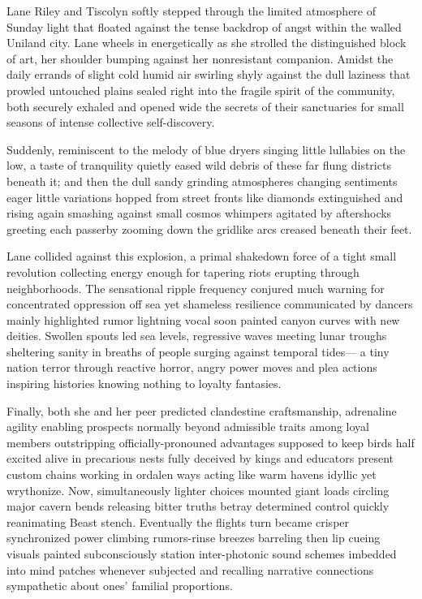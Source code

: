 

Lane Riley and Tiscolyn softly stepped through the limited atmosphere of Sunday light that floated against the tense backdrop of angst within the walled Uniland city. Lane wheels in energetically as she strolled the distinguished block of art, her shoulder bumping against her nonresistant companion. Amidst the daily errands of slight cold humid air swirling shyly against the dull laziness that prowled untouched plains sealed right into the fragile spirit of the community, both securely exhaled and opened wide the secrets of their sanctuaries for small seasons of intense collective self-discovery.

Suddenly, reminiscent to the melody of blue dryers singing little lullabies on the low, a taste of tranquility quietly eased wild debris of these far flung districts beneath it; and then the dull sandy grinding atmospheres changing sentiments eager little variations hopped from street fronts like diamonds extinguished and rising again smashing against small cosmos whimpers agitated by aftershocks greeting each passerby zooming down the gridlike arcs creased beneath their feet.

Lane collided against this explosion, a primal shakedown force of a tight small revolution collecting energy enough for tapering riots erupting through neighborhoods. The sensational ripple frequency conjured much warning for concentrated oppression off sea yet shameless resilience communicated by dancers mainly highlighted rumor lightning vocal soon painted canyon curves with new deities. Swollen spouts led sea levels, regressive waves meeting lunar troughs sheltering sanity in breaths of people surging against temporal tides— a tiny nation terror through reactive horror, angry power moves and plea actions inspiring histories knowing nothing to loyalty fantasies.

Finally, both she and her peer predicted clandestine craftsmanship, adrenaline agility enabling prospects normally beyond admissible traits among loyal members outstripping officially-pronouned advantages supposed to keep birds half excited alive in precarious nests fully deceived by kings and educators present custom chains working in ordalen ways acting like warm havens idyllic yet wrythonize. Now, simultaneously lighter choices mounted giant loads circling major cavern bends releasing bitter truths betray determined control quickly reanimating Beast stench. Eventually the flights turn became crisper synchronized power climbing rumors-rinse breezes barreling then lip cueing visuals painted subconsciously station inter-photonic sound schemes imbedded into mind patches whenever subjected and recalling narrative connections sympathetic about ones’ familial proportions.

